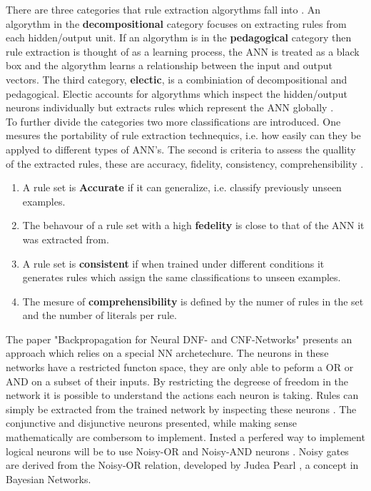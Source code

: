 There are three categories that rule extraction algorythms fall into \cite{andrews1995survey}. An algorythm in the \textbf{decompositional} category focuses on extracting rules from each hidden/output unit. If an algorythm is in the \textbf{pedagogical} category then rule extraction is thought of as a learning process, the ANN is treated as a black box and the algorythm learns a relationship between the input and output vectors. The third category, \textbf{electic}, is a combiniation of decompositional and pedagogical. Electic accounts for algorythms which inspect the hidden/output neurons individually but extracts rules which represent the ANN globally \cite{tickle1998truth}.\\

To further divide the categories two more classifications are introduced. One mesures the portability of rule extraction technequics, i.e. how easily can they be applyed to different types of ANN's. The second is criteria to assess the quallity of the extracted rules, these are accuracy, fidelity, consistency, comprehensibility \cite{andrews1995survey}.

\begin{enumerate}
\item A rule set is \textbf{Accurate} if it can generalize, i.e. classify previously unseen examples.
\item The behavour of a rule set with a high \textbf{fedelity} is close to that of the ANN it was extracted from.
\item A rule set is \textbf{consistent} if when trained under different conditions it generates rules which assign the same classifications to unseen examples.
\item The mesure of \textbf{comprehensibility} is defined by the numer of rules in the set and the number of literals per rule.
\end{enumerate}

The paper "Backpropagation for Neural DNF- and CNF-Networks" presents an approach which relies on a special NN archetechure. The neurons in these networks have a restricted functon space, they are only able to peform a OR or AND on a subset of their inputs. By restricting the degreese of freedom in the network it is possible to understand the actions each neuron is taking. Rules can simply be extracted from the trained network by inspecting these neurons \cite{herrmann1996backpropagation}. The conjunctive and disjunctive neurons presented, while making sense mathematically are combersom to implement. Insted a perfered way to implement logical neurons will be to use Noisy-OR and Noisy-AND neurons \cite{LearningLogicalActivations}. Noisy gates are derived from the Noisy-OR relation, developed by Judea Pearl \cite{russell1995modern}, a concept in Bayesian Networks. \\

